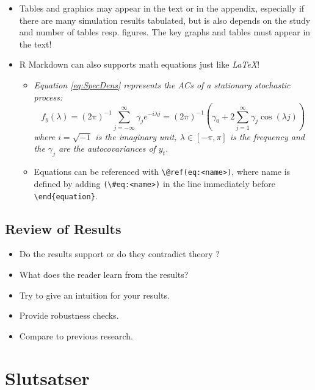 \documentclass[a4paper,11pt]{article}
\begin{document}
\begin{itemize}
\item
  Tables and graphics may appear in the text or in the appendix, especially if
  there are many simulation results tabulated, but is also depends on the study
  and number of tables resp. figures. The key graphs and tables must appear in
  the text!
\item
  R Markdown can also supports math equations just like \emph{LaTeX}!
  \begin{itemize}
  \item
    \emph{Equation \eqref{eq:SpecDens} represents the ACs of a stationary
    stochastic process:}
    \begin{equation}
            f_y(\lambda) = (2\pi)^{-1} \sum_{j=-\infty}^{\infty}
                           \gamma_j e^{-i\lambda j}
                         =(2\pi)^{-1}\left(\gamma_0 + 2 \sum_{j=1}^{\infty}
        \gamma_j \cos(\lambda j)\right)
                                       \label{eq:SpecDens}
    \end{equation}
    \emph{where \(i=\sqrt{-1}\) is the imaginary unit, \(\lambda \in [-\pi, \pi]\) is the
    frequency and the \(\gamma_j\) are the autocovariances of \(y_t\).}
  \item
    Equations can be referenced with \texttt{\textbackslash{}@ref(eq:\textless{}name\textgreater{})}, where name is defined
    by adding \texttt{(\textbackslash{}\#eq:\textless{}name\textgreater{})} in the line immediately before \texttt{\textbackslash{}end\{equation\}}.
  \end{itemize}
\end{itemize}
\hypertarget{review-of-results}{%
\subsection{Review of Results}\label{review-of-results}}
\begin{itemize}
\item
  Do the results support or do they contradict theory ?
\item
  What does the reader learn from the results?
\item
  Try to give an intuition for your results.
\item
  Provide robustness checks.
\item
  Compare to previous research.
\end{itemize}
\hypertarget{sec:slutsats}{%
\section{Slutsatser}\label{sec:slutsats}}
\end{document}
